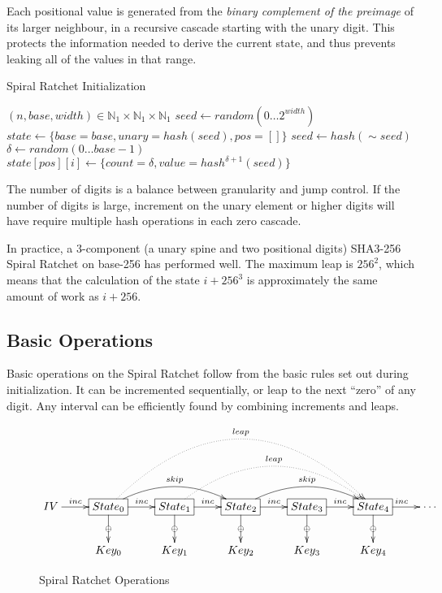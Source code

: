 \documentclass{article}
\begin{document}
	Each positional value is generated from the \emph{binary complement of the preimage} of its larger neighbour, in a recursive cascade starting with the unary digit. This protects the information needed to derive the current state, and thus prevents leaking all of the values in that range.
		
	\begin{algorithm}
		\caption{Spiral Ratchet Initialization}
		\label{alg:setup}

		\begin{algorithmic}[1]
			\Require $(n, base, width) \in \mathbb{N}_{1}\times{\mathbb{N}_{1}\times{\mathbb{N}_{1}}}$
			\State $seed \gets random(0\ldots{2^{width}})$
			\State $state \gets \lbrace base = base, unary = hash(seed), pos = [] \rbrace$
			 
				\State $seed \gets hash(\sim{seed})$ 
				\State $\delta \gets random(0\ldots{base - 1})$
				\State $state[pos][i] \gets \{count = \delta, value = hash^{\delta + 1}(seed)\rbrace$
			\EndFor
			\\
		\end{algorithmic}
	\end{algorithm}

	The number of digits is a balance between granularity and jump control. If the number of digits is large, increment on the unary element or higher digits will have require multiple hash operations in each zero cascade.
	
	In practice, a 3-component (a unary spine and two positional digits) SHA3-256 Spiral Ratchet on base-256 has performed well. The maximum leap is $256^{2}$, which means that the calculation of the state $i + 256^{3}$ is approximately the same amount of work as $i + 256$.

	\subsection{Basic Operations}
	
	Basic operations on the Spiral Ratchet follow from the basic rules set out during initialization. It can be incremented sequentially, or leap to the next ``zero'' of any digit. Any interval can be efficiently found by combining increments and leaps.
	
	\begin{figure}[h]
		\centering
		
		$\xymatrix{
			IV \ar[r]^<<<<<{inc} 
				& *+[F]{State_{0}}
					\ar[d]|\oplus
					\ar[r]^{inc}
					\ar@/^1.5pc/[rr]^{skip}
					\ar@{.>}@/^5pc/[rrrr]^{leap}
				& *+[F]{State_{1}}
					\ar[d]|\oplus
					\ar[r]^{inc}
					\ar@{.>}@/^3pc/[rrr]^{leap}
				& *+[F]{State_{2}} 
					\ar[d]|\oplus
					\ar[r]^{inc}
					\ar@/^1.5pc/[rr]^{skip}
				& *+[F]{State_{3}}
					\ar[d]|\oplus
					\ar[r]^{inc}
				& *+[F]{State_{4}}
					\ar[d]|\oplus
					\ar[r]^{inc}
				& \cdots
			\\
				& Key_{0}
				& Key_{1}
				& Key_{2}
				& Key_{3}
				& Key_{4}
		}$
		
		\caption{Spiral Ratchet Operations}
	\end{figure}
\end{document}
